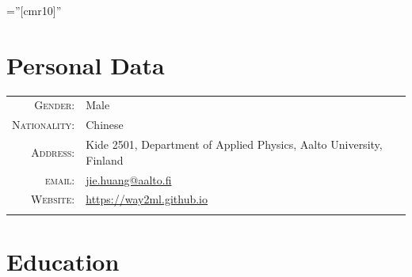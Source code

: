 \documentclass[a4paper,10pt]{article} %
\begin{document}
\font\fb=''[cmr10]'' %

\par{\bigskip\par} %

\section{Personal Data}

\begin{tabular}{rl}
\textsc{Gender:}                  	& Male \\
\textsc{Nationality:}               & Chinese \\
\textsc{Address:} 					& Kide 2501, Department of Applied Physics, Aalto University, Finland  \\
\textsc{email:} 					& 
\href{mailto:jie.huang@aalto.fi}{jie.huang@aalto.fi} \\
\textsc{Website:}                   & \href{https://way2ml.github.io}{https://way2ml.github.io}\\
\multicolumn{2}{c}{} \\	%
\end{tabular}



\section{Education}
\end{document}

